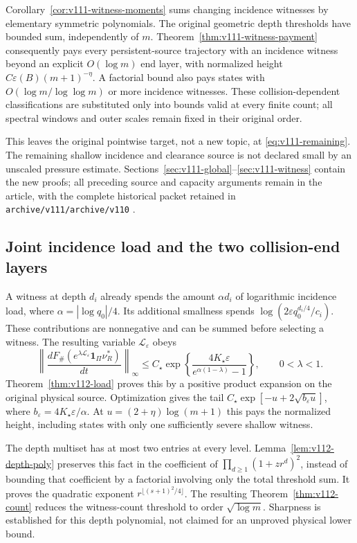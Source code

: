 \documentclass[11pt,reqno]{amsart}
\numberwithin{equation}{section}
\theoremstyle{definition}\newtheorem{definition}[theorem]{Definition}
\theoremstyle{remark}\newtheorem{remark}[theorem]{Remark}
\newcommand{\one}{\mathbf1}\newcommand{\dd}{\,\mathrm d}
\begin{document}
Corollary~\ref{cor:v111-witness-moments} sums changing incidence
witnesses by elementary symmetric polynomials. The original geometric
depth thresholds have bounded sum, independently of $m$.
Theorem~\ref{thm:v111-witness-payment} consequently pays every
persistent-source trajectory with an incidence witness beyond an
explicit $O(\log m)$ end layer, with normalized height
$C\varepsilon(B)(m+1)^{-\eta}$. A factorial bound also pays states
with $O(\log m/\log\log m)$ or more incidence witnesses. These
collision-dependent classifications are substituted only into bounds
valid at every finite count; all spectral windows and outer scales
remain fixed in their original order.

This leaves the original pointwise target, not a new topic, at
\eqref{eq:v111-remaining}. The remaining shallow incidence and
clearance source is not declared small by an unscaled pressure
estimate. Sections~\ref{sec:v111-global}--\ref{sec:v111-witness}
contain the new proofs; all preceding source and capacity arguments
remain in the article, with the complete historical packet retained
in \texttt{archive/v111/archive/v110} \cite{Q110}.


\subsection*{Joint incidence load and the two collision-end layers}
A witness at depth $d_i$ already spends the amount
$\alpha d_i$ of logarithmic incidence load, where
$\alpha=|\log q_0|/4$. Its additional smallness spends
$\log(2\varepsilon q_0^{d_i/4}/c_i)$. These contributions are
nonnegative and can be summed before selecting a witness. The
resulting variable $\mathscr L_\varepsilon$ obeys
\[
 \left\|\frac{dF_\#(e^{\lambda\mathscr L_\varepsilon}
                               \one_\Pi\nu_R^*)}{dt}\right\|_\infty
 \le C_\star\exp\left\{\frac{4K_\star\varepsilon}
                                  {e^{\alpha(1-\lambda)}-1}\right\},
 \qquad 0<\lambda<1.
\]
Theorem~\ref{thm:v112-load} proves this by a positive product
expansion on the original physical source. Optimization gives the
tail $C_\star\exp[-u+2\sqrt{b_\varepsilon u}]$, where
$b_\varepsilon=4K_\star\varepsilon/\alpha$.
At $u=(2+\eta)\log(m+1)$ this pays the normalized height, including
states with only one sufficiently severe shallow witness.

The depth multiset has at most two entries at every level.
Lemma~\ref{lem:v112-depth-poly} preserves this fact in the
coefficient of $\prod_{d\ge1}(1+zr^d)^2$, instead of bounding that
coefficient by a factorial involving only the total threshold sum.
It proves the quadratic exponent
$r^{\lfloor(s+1)^2/4\rfloor}$. The resulting
Theorem~\ref{thm:v112-count} reduces the witness-count threshold to
order $\sqrt{\log m}$. Sharpness is established for this depth
polynomial, not claimed for an unproved physical lower bound.
\end{document}

